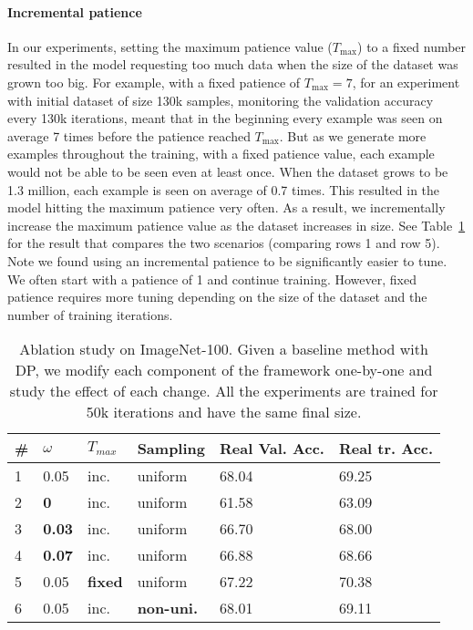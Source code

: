 \paragraph{Incremental patience}
In our experiments, setting the maximum patience value ($T_{\text{max}}$) to a fixed number resulted in the model requesting too much data when the size of the dataset was grown too big. For example, with a fixed patience of $T_\textrm{max}=7$, for an experiment with initial dataset of size 130k samples, monitoring the validation accuracy every 130k iterations, meant that in the beginning every example was seen on average 7 times before the patience reached $T_{\text{max}}$. But as we generate more examples throughout the training, with a fixed patience value, each example would not be able to be seen even at least once. When the dataset grows to be 1.3 million, each example is seen on average of 0.7 times. This resulted in the model hitting the maximum patience very often. As a result, we incrementally increase the maximum patience value as the dataset increases in size. See Table~\ref{tab:in100_ab} for the result that compares the two scenarios (comparing rows 1 and row 5). Note we found using an incremental patience to be significantly easier to tune. We often start with a patience of 1 and continue training. However, fixed patience requires more tuning depending on the size of the dataset and the number of training iterations.

\begin{table}[h]
\centering
\caption{Ablation study on ImageNet-100. Given a baseline method with DP, we modify each component of the framework one-by-one and study the effect of each change. All the experiments are trained for 50k iterations and have the same final size.}\label{tab:in100_ab}
\vspace{0.4cm}
{\small
\begin{tabular}{llllll}
\toprule
\# & $\omega$ & $T_{max}$ & Sampling & Real Val. Acc. & Real tr. Acc. \\ 
\midrule
\midrule
1   & 0.05     & inc. & uniform & 68.04  &  69.25           \\
2                         & \textbf{0}        & inc. & uniform & 61.58 &  63.09            \\
3                        & \textbf{0.03}     & inc.  & uniform & 66.70  &  68.00           \\
4                       & \textbf{0.07}     & inc.  & uniform & 66.88 &    68.66            \\
5    & 0.05     & \textbf{fixed}   & uniform & 67.22 & 70.38 \\
6           & 0.05     & inc. & \textbf{non-uni. }& 68.01 &  69.11  \\
\bottomrule
\end{tabular}
}
\end{table}





